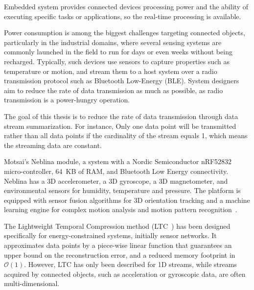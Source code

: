 Embedded system provides connected devices processing power and the ability of
executing specific tasks or applications, so the real-time processing is
available. 

Power consumption is among the biggest challenges targeting connected  objects,
particularly in the industrial domains, where several sensing  systems are
commonly launched in the field to run for days or even  weeks without being
recharged. Typically, such devices use sensors to  capture properties such as
temperature or motion, and stream them to a  host system over a radio
transmission protocol such as Bluetooth  Low-Energy (BLE). System designers aim
to reduce the rate of data  transmission as much as possible, as radio
transmission is a  power-hungry operation.



The goal of this thesis is to reduce the rate of data transmission through data
stream summarization. For instance, Only one data point will be transmitted
rather than all data points if the cardinality of the stream equals 1, which
means the streaming data are constant.


Motsai's Neblina module, a system with a Nordic Semiconductor nRF52832
micro-controller, 64~KB of RAM,  and Bluetooth Low Energy connectivity. Neblina
has a 3D  accelerometer, a 3D gyroscope, a 3D magnetometer, and environmental
sensors for humidity, temperature and pressure. The platform is  equipped with
sensor fusion algorithms for 3D orientation tracking and  a machine learning
engine for complex motion analysis and motion  pattern
recognition~\cite{sarbishei2016accuracy}.







The Lightweight Temporal Compression method 
(LTC~\cite{schoellhammer2004lightweight}) has been designed 
specifically for energy-constrained systems, initially sensor networks. 
It approximates data points by a piece-wise linear function that 
guarantees an upper bound on the reconstruction error, and a reduced 
memory footprint in $\mathcal{O}(1)$. However, LTC has only been 
described for 1D streams, while streams acquired by connected objects, such as 
acceleration or gyroscopic data, are often multi-dimensional. 


